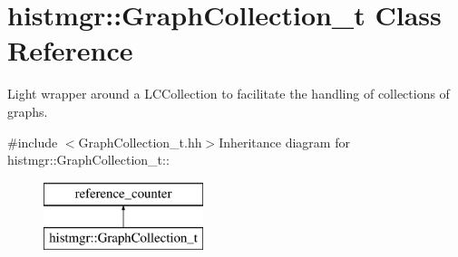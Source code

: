\section{histmgr::GraphCollection\_\-t Class Reference}
\label{classhistmgr_1_1GraphCollection__t}


Light wrapper around a LCCollection to facilitate the handling of collections of graphs.  


{\ttfamily \#include $<$GraphCollection\_\-t.hh$>$}Inheritance diagram for histmgr::GraphCollection\_\-t::\begin{figure}[H]
\begin{center}
\leavevmode
\includegraphics[height=2cm]{classhistmgr_1_1GraphCollection__t}
\end{center}
\end{figure}
